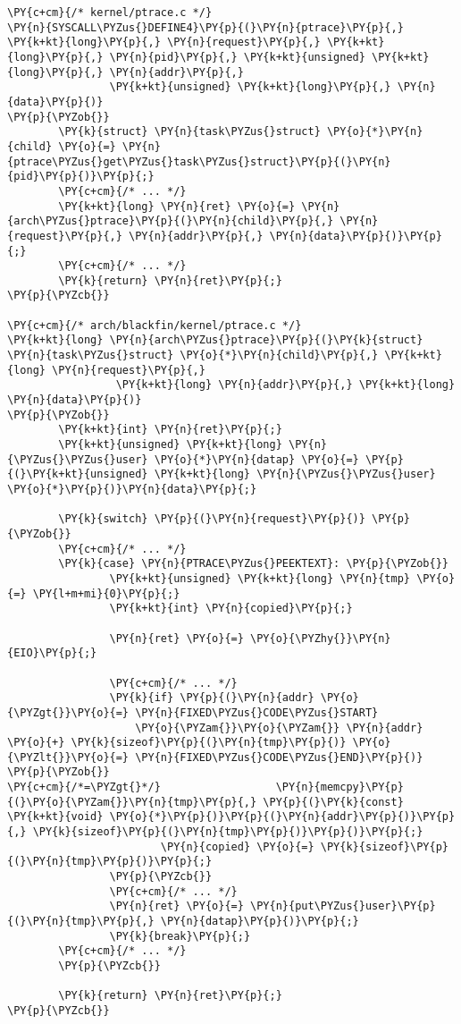 \begin{Verbatim}[commandchars=\\\{\}]
\PY{c+cm}{/* kernel/ptrace.c */}
\PY{n}{SYSCALL\PYZus{}DEFINE4}\PY{p}{(}\PY{n}{ptrace}\PY{p}{,} \PY{k+kt}{long}\PY{p}{,} \PY{n}{request}\PY{p}{,} \PY{k+kt}{long}\PY{p}{,} \PY{n}{pid}\PY{p}{,} \PY{k+kt}{unsigned} \PY{k+kt}{long}\PY{p}{,} \PY{n}{addr}\PY{p}{,}
                \PY{k+kt}{unsigned} \PY{k+kt}{long}\PY{p}{,} \PY{n}{data}\PY{p}{)}
\PY{p}{\PYZob{}}
        \PY{k}{struct} \PY{n}{task\PYZus{}struct} \PY{o}{*}\PY{n}{child} \PY{o}{=} \PY{n}{ptrace\PYZus{}get\PYZus{}task\PYZus{}struct}\PY{p}{(}\PY{n}{pid}\PY{p}{)}\PY{p}{;}
        \PY{c+cm}{/* ... */}
        \PY{k+kt}{long} \PY{n}{ret} \PY{o}{=} \PY{n}{arch\PYZus{}ptrace}\PY{p}{(}\PY{n}{child}\PY{p}{,} \PY{n}{request}\PY{p}{,} \PY{n}{addr}\PY{p}{,} \PY{n}{data}\PY{p}{)}\PY{p}{;}
        \PY{c+cm}{/* ... */}
        \PY{k}{return} \PY{n}{ret}\PY{p}{;}
\PY{p}{\PYZcb{}}

\PY{c+cm}{/* arch/blackfin/kernel/ptrace.c */}
\PY{k+kt}{long} \PY{n}{arch\PYZus{}ptrace}\PY{p}{(}\PY{k}{struct} \PY{n}{task\PYZus{}struct} \PY{o}{*}\PY{n}{child}\PY{p}{,} \PY{k+kt}{long} \PY{n}{request}\PY{p}{,}
                 \PY{k+kt}{long} \PY{n}{addr}\PY{p}{,} \PY{k+kt}{long} \PY{n}{data}\PY{p}{)}
\PY{p}{\PYZob{}}
        \PY{k+kt}{int} \PY{n}{ret}\PY{p}{;}
        \PY{k+kt}{unsigned} \PY{k+kt}{long} \PY{n}{\PYZus{}\PYZus{}user} \PY{o}{*}\PY{n}{datap} \PY{o}{=} \PY{p}{(}\PY{k+kt}{unsigned} \PY{k+kt}{long} \PY{n}{\PYZus{}\PYZus{}user} \PY{o}{*}\PY{p}{)}\PY{n}{data}\PY{p}{;}

        \PY{k}{switch} \PY{p}{(}\PY{n}{request}\PY{p}{)} \PY{p}{\PYZob{}}
        \PY{c+cm}{/* ... */}
        \PY{k}{case} \PY{n}{PTRACE\PYZus{}PEEKTEXT}: \PY{p}{\PYZob{}}
                \PY{k+kt}{unsigned} \PY{k+kt}{long} \PY{n}{tmp} \PY{o}{=} \PY{l+m+mi}{0}\PY{p}{;}
                \PY{k+kt}{int} \PY{n}{copied}\PY{p}{;}

                \PY{n}{ret} \PY{o}{=} \PY{o}{\PYZhy{}}\PY{n}{EIO}\PY{p}{;}

                \PY{c+cm}{/* ... */}
                \PY{k}{if} \PY{p}{(}\PY{n}{addr} \PY{o}{\PYZgt{}}\PY{o}{=} \PY{n}{FIXED\PYZus{}CODE\PYZus{}START}
                    \PY{o}{\PYZam{}}\PY{o}{\PYZam{}} \PY{n}{addr} \PY{o}{+} \PY{k}{sizeof}\PY{p}{(}\PY{n}{tmp}\PY{p}{)} \PY{o}{\PYZlt{}}\PY{o}{=} \PY{n}{FIXED\PYZus{}CODE\PYZus{}END}\PY{p}{)} \PY{p}{\PYZob{}}
\PY{c+cm}{/*=\PYZgt{}*/}                  \PY{n}{memcpy}\PY{p}{(}\PY{o}{\PYZam{}}\PY{n}{tmp}\PY{p}{,} \PY{p}{(}\PY{k}{const} \PY{k+kt}{void} \PY{o}{*}\PY{p}{)}\PY{p}{(}\PY{n}{addr}\PY{p}{)}\PY{p}{,} \PY{k}{sizeof}\PY{p}{(}\PY{n}{tmp}\PY{p}{)}\PY{p}{)}\PY{p}{;}
                        \PY{n}{copied} \PY{o}{=} \PY{k}{sizeof}\PY{p}{(}\PY{n}{tmp}\PY{p}{)}\PY{p}{;}
                \PY{p}{\PYZcb{}}
                \PY{c+cm}{/* ... */}
                \PY{n}{ret} \PY{o}{=} \PY{n}{put\PYZus{}user}\PY{p}{(}\PY{n}{tmp}\PY{p}{,} \PY{n}{datap}\PY{p}{)}\PY{p}{;}
                \PY{k}{break}\PY{p}{;}
        \PY{c+cm}{/* ... */}
        \PY{p}{\PYZcb{}}

        \PY{k}{return} \PY{n}{ret}\PY{p}{;}
\PY{p}{\PYZcb{}}
\end{Verbatim}
